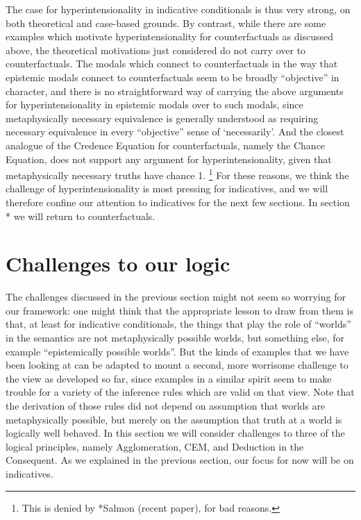 \documentclass[If.tex]{subfiles}
\begin{document}
The case for hyperintensionality in indicative conditionals is thus very strong, on both theoretical and case-based grounds.  By contrast, while there are some examples which motivate hyperintensionality for counterfactuals as discussed above, the theoretical motivations just considered do not carry over to counterfactuals.  The modals which connect to counterfactuals in the way that epistemic modals connect to counterfactuals seem to be broadly “objective” in character, and there is no straightforward way of carrying the above arguments for hyperintensionality in epistemic modals over to such modals, since metaphysically necessary equivalence is generally understood as requiring necessary equivalence in every “objective” sense of ‘necessarily’.  And the closest analogue of the Credence Equation for counterfactuals, namely the Chance Equation, does not support any argument for hyperintensionality, given that metaphysically necessary truths have chance 1.%
\footnote{This is denied by *Salmon (recent paper), for bad reasons.}
For these reasons, we think the challenge of hyperintensionality is most pressing for indicatives, and we will therefore confine our attention to indicatives for the next few sections.  In section * we will return to counterfactuals. 
		
		
		
\section{Challenges to our logic}
\label{challenges}

The challenges discussed in the previous section might not seem so worrying for our framework: one might think that the appropriate lesson to draw from them is that, at least for indicative conditionals, the things that play the role of “worlds” in the semantics are not metaphysically possible worlds, but something else, for example “epistemically possible worlds”.  But the kinds of examples that we have been looking at can be adapted to mount a second, more worrisome challenge to the view as developed so far, since examples in a similar spirit seem to make trouble for a variety of the inference rules which are valid on that view.  Note that the derivation of those rules did not depend on assumption that worlds are metaphysically possible, but merely on the assumption that truth at a world is logically well behaved.  In this section we will consider challenges to three of the logical principles, namely Agglomeration, CEM, and Deduction in the Consequent.  As we explained in the previous section, our focus for now will be on indicatives.  
\end{document}
